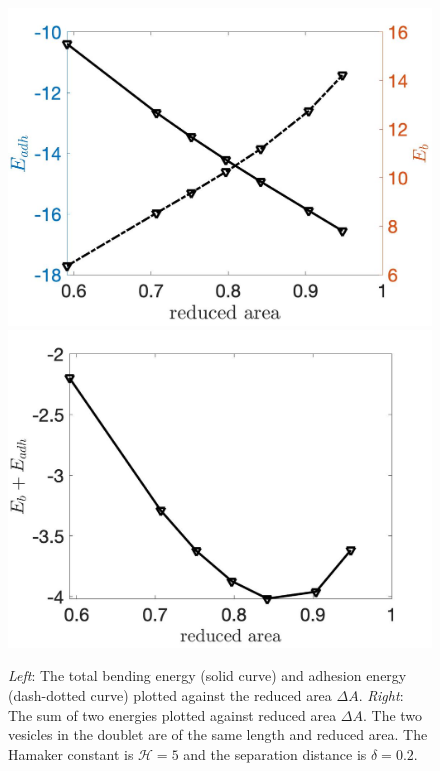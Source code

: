 \documentclass[prf,superscriptaddress,showpacs]{revtex4-1}
\begin{document}
\begin{figure}
\includegraphics[keepaspectratio=true,scale=0.175]{figs/Dec18_Ebleft_Eadhright_vs_rA_adR0p2_adS502.jpeg}
\includegraphics[keepaspectratio=true,scale=0.175]{figs/Dec18_EbEadh_vs_rA_adR0p2_adS502.jpeg}
  \caption{\label{fig:Dec18_vesicle_equilibrium1}   {\em Left}: The
  total bending energy (solid curve) and adhesion energy (dash-dotted
  curve) plotted against the reduced area $\Delta A$. {\em Right}: The
  sum of two energies plotted against reduced area $\Delta A$. The two
  vesicles in the doublet are of the same length and reduced area.  The
  Hamaker constant is $\mathcal{H} = 5$ and the separation distance is
  $\delta = 0.2$.}
\end{figure}
\end{document}
